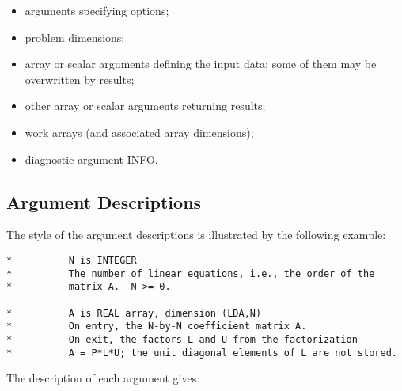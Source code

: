 \begin{itemize}

\item arguments specifying options;

\item problem dimensions;

\item array or scalar arguments defining the input data; some of them may be 
overwritten by results;

\item other array or scalar arguments returning results;

\item work arrays (and associated array dimensions);

\item diagnostic argument INFO.
 
\end{itemize}

\subsection{Argument Descriptions}\label{subsecargdesc}

The style of the argument  
descriptions is illustrated by the following example:

\begin{verbatim}
*          N is INTEGER
*          The number of linear equations, i.e., the order of the
*          matrix A.  N >= 0.

*          A is REAL array, dimension (LDA,N)
*          On entry, the N-by-N coefficient matrix A.
*          On exit, the factors L and U from the factorization
*          A = P*L*U; the unit diagonal elements of L are not stored.
\end{verbatim}

The description of each argument gives:

